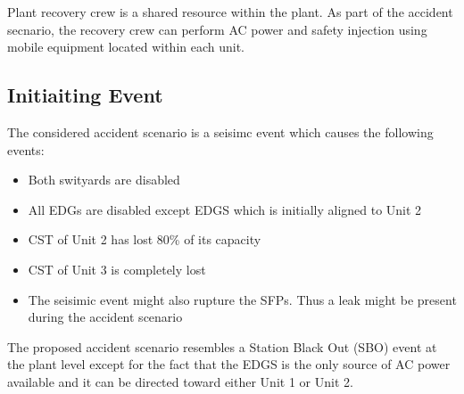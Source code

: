 Plant recovery crew is a shared resource within the plant. As part of the accident secnario, the recovery 
crew can perform AC power and safety injection using mobile equipment located within each unit.


\subsection{Initiaiting Event}

The considered accident scenario is a seisimc event which causes the following events:
\begin{itemize}
  \item Both swityards are disabled
  \item All EDGs are disabled except EDGS which is initially aligned to Unit 2
  \item CST of Unit 2 has lost 80\% of its capacity 
  \item CST of Unit 3 is completely lost
  \item The seisimic event might also rupture the SFPs. Thus a leak might be present during the accident scenario
\end{itemize}

The proposed accident scenario resembles a Station Black Out  (SBO) event at the plant level except for the 
fact that the EDGS is the only source of AC power available and it can be directed toward either Unit 1 or Unit 2.
